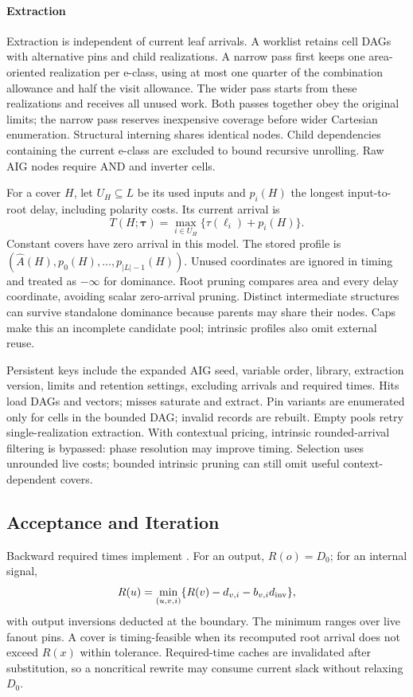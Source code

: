 \paragraph{Extraction}
Extraction is independent of current leaf arrivals. A worklist retains cell DAGs with alternative pins and child realizations. A narrow pass first keeps one area-oriented realization per e-class, using at most one quarter of the combination allowance and half the visit allowance. The wider pass starts from these realizations and receives all unused work. Both passes together obey the original limits; the narrow pass reserves inexpensive coverage before wider Cartesian enumeration. Structural interning shares identical nodes. Child dependencies containing the current e-class are excluded to bound recursive unrolling. Raw AIG nodes require AND and inverter cells.

For a cover $H$, let $U_H\subseteq L$ be its used inputs and $p_i(H)$ the longest input-to-root delay, including polarity costs. Its current arrival is
\begin{equation}\label{eq:profile}
T(H;\boldsymbol{\tau})=\max_{i\in U_H}\{\tau(\ell_i)+p_i(H)\}.
\end{equation}
Constant covers have zero arrival in this model. The stored profile is $(\widehat A(H),p_0(H),\ldots,p_{|L|-1}(H))$. Unused coordinates are ignored in timing and treated as $-\infty$ for dominance. Root pruning compares area and every delay coordinate, avoiding scalar zero-arrival pruning. Distinct intermediate structures can survive standalone dominance because parents may share their nodes. Caps make this an incomplete candidate pool; intrinsic profiles also omit external reuse.

Persistent keys include the expanded AIG seed, variable order, library, extraction version, limits and retention settings, excluding arrivals and required times. Hits load DAGs and vectors; misses saturate and extract. Pin variants are enumerated only for cells in the bounded DAG; invalid records are rebuilt. Empty pools retry single-realization extraction. With contextual pricing, intrinsic rounded-arrival filtering is bypassed: phase resolution may improve timing. Selection uses unrounded live costs; bounded intrinsic pruning can still omit useful context-dependent covers.

\subsection{Acceptance and Iteration}\label{sec:accept}
Backward required times implement . For an output, $R(o)=D_0$; for an internal signal,
\begin{equation}
 R(u)=\min_{(u,v,i)}\{R(v)-d_{v,i}-b_{v,i}d_{\rm inv}\},\label{eq:required}
\end{equation}
with output inversions deducted at the boundary. The minimum ranges over live fanout pins. A cover is timing-feasible when its recomputed root arrival does not exceed $R(x)$ within tolerance. Required-time caches are invalidated after substitution, so a noncritical rewrite may consume current slack without relaxing $D_0$.

